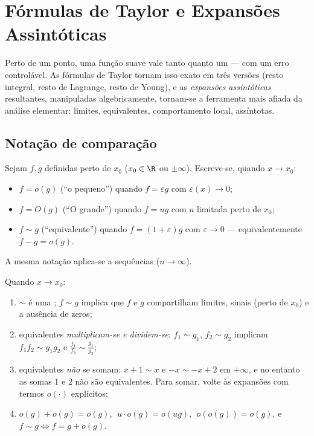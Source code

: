 \chapter{Fórmulas de Taylor e Expansões Assintóticas}\label{ch:b1:taylor}

Perto de um ponto, uma função suave vale tanto quanto um  ---
com um erro controlável. As fórmulas de Taylor tornam isso exato em três
versões (resto integral, resto de Lagrange, resto de Young), e as
\emph{expansões assintóticas} resultantes, manipuladas algebricamente,
tornam-se a ferramenta mais afiada da análise elementar: limites,
equivalentes, comportamento local, assíntotas.

\section{Notação de comparação}

\begin{definition}\label{def:b1:taylor:landau}
Sejam $f, g$ definidas perto de $x_0$ ($x_0 \in \R$ ou $\pm\infty$). Escreve-se, quando
$x \to x_0$:
\begin{itemize}
  \item $f = o(g)$ (``o pequeno'') quando $f = \varepsilon g$ com
        $\varepsilon(x) \to 0$;
  \item $f = O(g)$ (``O grande'') quando $f = u g$ com $u$ limitada perto de
        $x_0$;
  \item $f \sim g$ (``equivalente'') quando
        $f = (1 + \varepsilon) g$ com $\varepsilon \to 0$ ---
        equivalentemente $f - g = o(g)$.
\end{itemize}
A mesma notação aplica-se a sequências ($n \to \infty$).
\end{definition}

\begin{proposition}[Regras]\label{prop:b1:taylor:landaurules}
Quando $x \to x_0$:
\begin{enumerate}
  \item $\sim$ é uma ; $f \sim g$ implica que
        $f$ e $g$ compartilham limites, sinais (perto de $x_0$) e a
        ausência de zeros;
  \item equivalentes \emph{multiplicam-se e dividem-se}: $f_1 \sim g_1$, $f_2
        \sim g_2$
        implicam $f_1 f_2 \sim g_1 g_2$ e $\frac{f_1}{f_2}
        \sim \frac{g_1}{g_2}$;
  \item equivalentes \emph{não} se somam: $x + 1 \sim x$ e $-x \sim
        -x + 2$ em $+\infty$, e
        no entanto as somas $1$ e $2$ não são
        equivalentes. Para somar, volte às expansões com termos
        $o(\cdot)$ explícitos;
  \item $o(g) + o(g) = o(g)$, $\;u \cdot o(g) = o(ug)$, $\;o(o(g)) =
        o(g)$, e $f \sim g \iff f = g + o(g)$.
\end{enumerate}
\end{proposition}


